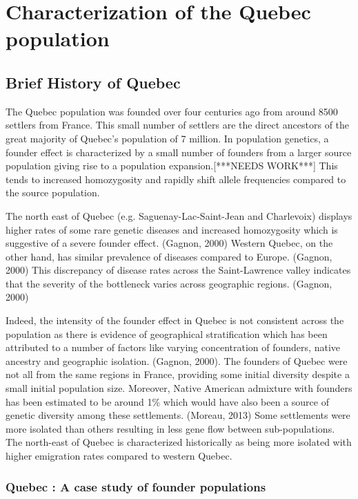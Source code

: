 \documentclass[
11pt, %
oneside, %
english, %
doublespacing, %
headsepline, %
]{MastersDoctoralThesis} %
\begin{document}
\chapter{Characterization of the Quebec population}

\section{Brief History of Quebec}
The Quebec population was founded over four centuries ago from around 8500 settlers from France.
This small number of settlers are the direct ancestors of the great majority of Quebec's population of 7 million.
In population genetics, a founder effect is characterized by a small number of founders from a larger source population giving rise to a population expansion.[***NEEDS WORK***]
This tends to increased homozygosity and rapidly shift allele frequencies compared to the source population.

The north east of Quebec (e.g. Saguenay-Lac-Saint-Jean and Charlevoix) displays higher rates of some rare genetic diseases and increased homozygosity which is suggestive of a severe founder effect. (Gagnon, 2000)
Western Quebec, on the other hand, has similar prevalence of diseases compared to Europe. (Gagnon, 2000)
This discrepancy of disease rates across the Saint-Lawrence valley indicates that the severity of the bottleneck varies across geographic regions. (Gagnon, 2000)

Indeed, the intensity of the founder effect in Quebec is not consistent across the population as there is evidence of geographical stratification which has been attributed to a number of factors like varying concentration of founders, native ancestry and geographic isolation. (Gagnon, 2000).
The founders of Quebec were not all from the same regions in France, providing some initial diversity despite a small initial population size.
Moreover, Native American admixture with founders has been estimated to be around 1\% which would have also been a source of genetic diversity among these settlements. (Moreau, 2013)
Some settlements were more isolated than others resulting in less gene flow between sub-populations.
The north-east of Quebec is characterized historically as being more isolated with higher emigration rates compared to western Quebec.

\subsection{Quebec : A case study of founder populations}
\end{document}
